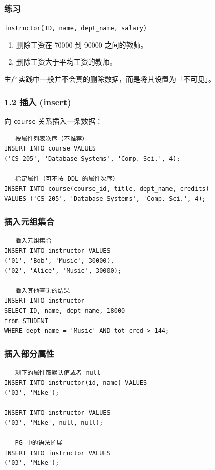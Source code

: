 \documentclass[aspectratio=169, 14pt]{beamer}
\begin{document}
\begin{frame}
    \frametitle{练习 {\large {}} }
    \texttt{instructor(ID, name, dept\_name, salary)}
    
    \begin{enumerate}
        \item 删除工资在 70000 到 90000 之间的教师。
        \item 删除工资大于平均工资的教师。
    \end{enumerate}

\end{frame}

{
\begin{frame}[standout]
  生产实践中一般并不会真的删除数据，而是将其设置为「不可见」。
\end{frame}
}

\begin{frame}[fragile]
    \frametitle{1.2 插入 (insert)}
向 \texttt{course} 关系插入一条数据：

\begin{verbatim}
-- 按属性列表次序（不推荐）
INSERT INTO course VALUES 
('CS-205', 'Database Systems', 'Comp. Sci.', 4);

-- 指定属性（可不按 DDL 的属性次序）
INSERT INTO course(course_id, title, dept_name, credits)
VALUES ('CS-205', 'Database Systems', 'Comp. Sci.', 4);
\end{verbatim}    

\end{frame}

\begin{frame}[fragile]
    \frametitle{插入元组集合}
    \begin{verbatim}
-- 插入元组集合
INSERT INTO instructor VALUES 
('01', 'Bob', 'Music', 30000),
('02', 'Alice', 'Music', 30000);

-- 插入其他查询的结果
INSERT INTO instructor
SELECT ID, name, dept_name, 18000
from STUDENT 
WHERE dept_name = 'Music' AND tot_cred > 144;
    \end{verbatim} 

\end{frame}

\begin{frame}[fragile]
    \frametitle{插入部分属性}
    \begin{verbatim}
-- 剩下的属性取默认值或者 null
INSERT INTO instructor(id, name) VALUES 
('03', 'Mike');

INSERT INTO instructor VALUES 
('03', 'Mike', null, null);

-- PG 中的语法扩展
INSERT INTO instructor VALUES 
('03', 'Mike');
    \end{verbatim}
\end{frame}
\end{document}
